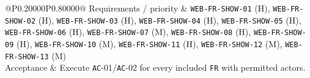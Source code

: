 \begin{longtable}{@{}P{0.20000\SRSWidth}P{0.80000\SRSWidth}@{}}
Requirements /\allowbreak{} priority & \texttt{WEB-\allowbreak{}FR-\allowbreak{}SHOW-\allowbreak{}01} (H), \texttt{WEB-\allowbreak{}FR-\allowbreak{}SHOW-\allowbreak{}02} (H), \texttt{WEB-\allowbreak{}FR-\allowbreak{}SHOW-\allowbreak{}03} (H), \texttt{WEB-\allowbreak{}FR-\allowbreak{}SHOW-\allowbreak{}04} (H), \texttt{WEB-\allowbreak{}FR-\allowbreak{}SHOW-\allowbreak{}05} (H), \texttt{WEB-\allowbreak{}FR-\allowbreak{}SHOW-\allowbreak{}06} (H), \texttt{WEB-\allowbreak{}FR-\allowbreak{}SHOW-\allowbreak{}07} (M), \texttt{WEB-\allowbreak{}FR-\allowbreak{}SHOW-\allowbreak{}08} (H), \texttt{WEB-\allowbreak{}FR-\allowbreak{}SHOW-\allowbreak{}09} (H), \texttt{WEB-\allowbreak{}FR-\allowbreak{}SHOW-\allowbreak{}10} (M), \texttt{WEB-\allowbreak{}FR-\allowbreak{}SHOW-\allowbreak{}11} (H), \texttt{WEB-\allowbreak{}FR-\allowbreak{}SHOW-\allowbreak{}12} (M), \texttt{WEB-\allowbreak{}FR-\allowbreak{}SHOW-\allowbreak{}13} (M) \\[3pt]
Acceptance & Execute \texttt{AC}-01/\allowbreak{}\texttt{AC}-02 for every included \texttt{FR} with permitted actors. \\[3pt]
\end{longtable}
\endgroup


